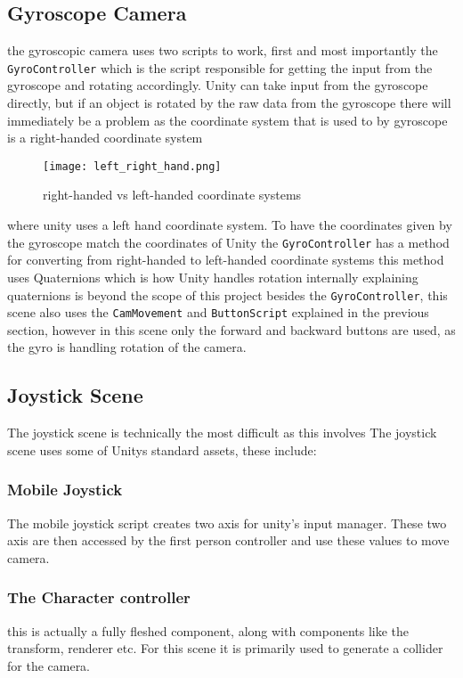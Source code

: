 \subsection{Gyroscope Camera}
the gyroscopic camera uses two scripts to work, first and most importantly the {\tt GyroController} which is the script responsible for getting the input from the gyroscope and 
rotating accordingly. Unity can take input from the gyroscope directly, but if an object is rotated by the raw data from the gyroscope there will immediately be a problem as the coordinate system that is used to by gyroscope is a right-handed coordinate system 
\begin{figure}[H]
\centering
\texttt{[image: left\_right\_hand.png]}
\caption{right-handed vs left-handed coordinate systems}
\end{figure}
where unity uses a left hand coordinate system. To have the coordinates given by the gyroscope match the coordinates of Unity the {\tt GyroController} has a method for converting from right-handed to left-handed coordinate systems this method uses Quaternions which is how Unity handles rotation internally explaining quaternions is beyond the scope of this project\label{quaternions}
besides the {\tt GyroController}, this scene also uses the {\tt CamMovement} and {\tt ButtonScript} explained in the previous section, however in this scene only the forward and backward buttons are used, as the gyro is handling rotation of the camera.
\subsection{Joystick Scene} 
The joystick scene is technically the most difficult as this involves 
The joystick scene uses some of Unitys standard assets, these include:
\subsubsection*{Mobile Joystick}
The mobile joystick script creates two axis for unity's input manager. These two axis are then accessed by the first person controller and use these values to move camera. 


\subsubsection*{The Character controller}
this is actually a fully fleshed component, along with components like the transform, renderer etc. For this scene it is primarily used to generate a collider for the camera. 
